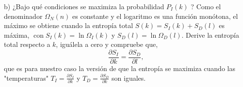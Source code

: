 b) ¿Bajo qué condiciones se maximiza la probabilidad $P_I(k)$ ? Como el denominador $\Omega_N(n)$ es constante y el logaritmo es una función monótona, el máximo se obtiene cuando la entropía total $S(k)=S_I(k)+S_D(l)$ es máxima, $\operatorname{con} S_I(k)=\ln \Omega_I(k)$ y $S_D(l)=\ln \Omega_D(l)$. Derive la entropía total respecto a $k$, iguálela a cero y compruebe que,
$$
\frac{\partial S_I}{\partial k}=\frac{\partial S_D}{\partial l},
$$
que es para nuestro caso la versión de que la entropía se maximiza cuando las "temperaturas" $T_I=\frac{\partial S_I}{\partial k}$ y $T_D=\frac{\partial S_D}{\partial k}$ son iguales.